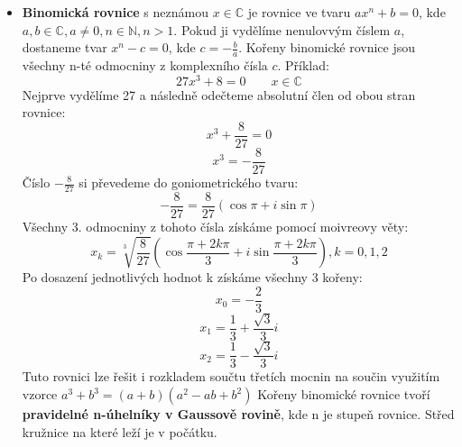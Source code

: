 \documentclass[12pt]{article}
\begin{document}
\begin{itemize} [itemsep = 2pt]
    Kvadratická rovnice s komplexními koeficienty je složitější, protože je typicky potřeba odmocnit komplexní diskriminant. Ukážeme si to na příkladu:
    \[z^2 + (1+i)z -2i = 0\]
    \[D = (1+i)^2 - 4\cdot 1 \cdot (-2i) = 10i\] 
    Diskriminant $D$ si převedem do goniometrického tvaru:
    \[10i = 10(\cos\frac{\pi}{2} + i\sin\frac{\pi}{2})\]
    A nyní můžeme použít moivreovu větu pro odmocnění komplexního čísla:
    \[\sqrt{10i} = \sqrt{10}\left(\cos\frac{\frac{\pi}{2}+2k\pi}{2} + i\sin\frac{\frac{\pi}{2}+2k\pi}{2}\right)\]
    Budu dosazovat jen pro $k = 0$ protože 2. řešení moivreovy věty je u druhé odmocniny číslo opačné a v samotném vzorci pro kvadratickou rovnici už je $\pm$
    \[\text{Pro k = 0} \qquad \sqrt{10i} = \frac{\sqrt{20}}{2} + \frac{\sqrt{20}}{2}i = \sqrt{5} + \sqrt{5}i\]
    Po dosazeí $\sqrt{D}$ do vzorce $z_{1,2} = \frac{-b \pm\sqrt{D}}{2a}$ dostaneme:
    \[z_1 = \frac{-(1+i) + \sqrt{5} + \sqrt{5}i}{2} = \frac{-1 + \sqrt{5}}{2} + \frac{-1 + \sqrt{5}}{2}i\]
    \[z_2 = \frac{-(1+i) - \sqrt{5} - \sqrt{5}i}{2} = \frac{-1 - \sqrt{5}}{2} + \frac{-1 - \sqrt{5}}{2}i\]
    \item \textbf{Binomická rovnice} s neznámou $x \in \mathbb{C}$ je rovnice ve tvaru $ax^n + b = 0$, kde $a,b \in \mathbb{C}, a \neq 0, n\in \mathbb{N}, n>1$. Pokud ji vydělíme nenulovvým číslem $a$, dostaneme tvar $x^n - c = 0$, kde $c = -\frac{b}{a}$. Kořeny binomické rovnice jsou všechny n-té odmocniny z komplexního čísla $c$. Příklad:
    \[27x^3 + 8 = 0 \qquad x\in \mathbb{C}\]
    Nejprve vydělíme 27 a následně odečteme absolutní člen od obou stran rovnice:
    \[x^3 + \frac{8}{27} = 0\]
    \[x^3 = -\frac{8}{27}\]
    Číslo $-\frac{8}{27}$ si převedeme do goniometrického tvaru:
    \[-\frac{8}{27} = \frac{8}{27}(\cos \pi + i\sin \pi)\]
    Všechny 3. odmocniny z tohoto čísla získáme pomocí moivreovy věty:
    \[x_k = \sqrt[3]{\frac{8}{27}}\left(\cos\frac{\pi + 2k\pi}{3} + i\sin\frac{\pi + 2k\pi}{3}\right), k = 0, 1, 2\]
    Po dosazení jednotlivých hodnot k získáme všechny 3 kořeny:
    \[x_0 = -\frac{2}{3}\]
    \[x_1 = \frac{1}{3} + \frac{\sqrt{3}}{3}i\]
    \[x_2 = \frac{1}{3} - \frac{\sqrt{3}}{3}i\]
    Tuto rovnici lze řešit i rozkladem součtu třetích mocnin na součin využitím vzorce $a^3 + b^3 = (a+b)(a^2 - ab + b^2)$
    Kořeny binomické rovnice tvoří \textbf{pravidelné n-úhelníky v Gaussově rovině}, kde n je stupeň rovnice. Střed kružnice na které leží je v počátku.
\end{itemize}
\end{document}
